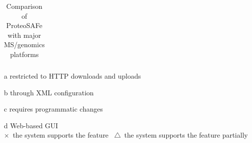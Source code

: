 \documentclass[arial,11pt]{article}
\newcommand{\SF}[1]{\textsf{#1}}
\newcommand{\SYSTEM}[0]{\SF{ProteoSAFe}\xspace}
\newcommand{\CHK}[0]{$\times$}
\newcommand{\PAR}[0]{$\bigtriangleup$}
\begin{document}
\begin{table}[!ht]
\begin{threeparttable}
\begin{tabular}{|c|ccccccc|cccc|cccccc|}
    \end{tabular}
    \begin{tablenotes}[para]
    \item[a]{restricted to HTTP downloads and uploads}
    \ \item[b]{through XML configuration}
    \item[c]{requires programmatic changes}
    \item[d]{Web-based GUI} \\
    \CHK \ the system supports the feature \    \PAR \ the system supports the feature partially
    \end{tablenotes}
  \end{threeparttable}
  \caption{\footnotesize Comparison of \SYSTEM with major MS/genomics platforms}
  \label{tab:assesment}
\end{table}
\end{document}
